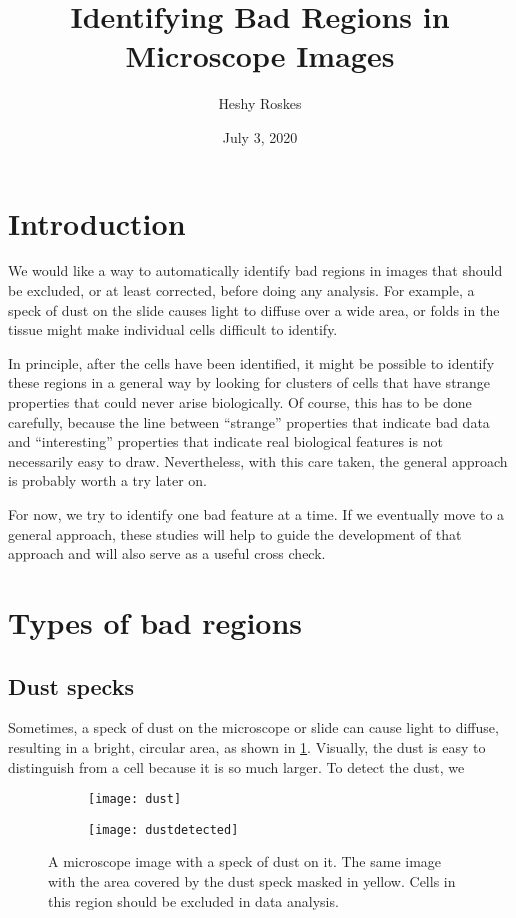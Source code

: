 \documentclass{article}
\begin{document}
	
\title{Identifying Bad Regions in Microscope Images}
\author{Heshy Roskes}
\date{July 3, 2020}

\section{Introduction}

We would like a way to automatically identify bad regions in images that should be excluded, or at least corrected, before doing any analysis.  For example, a speck of dust on the slide causes light to diffuse over a wide area, or folds in the tissue might make individual cells difficult to identify.

In principle, after the cells have been identified, it might be possible to identify these regions in a general way by looking for clusters of cells that have strange properties that could never arise biologically.  Of course, this has to be done carefully, because the line between ``strange'' properties that indicate bad data and ``interesting'' properties that indicate real biological features is not necessarily easy to draw.  Nevertheless, with this care taken, the general approach is probably worth a try later on.

For now, we try to identify one bad feature at a time.  If we eventually move to a general approach, these studies will help to guide the development of that approach and will also serve as a useful cross check.

\section{Types of bad regions}

\subsection{Dust specks}

Sometimes, a speck of dust on the microscope or slide can cause light to diffuse, resulting in a bright, circular area, as shown in \cref{fig:dustspeck}.  Visually, the dust is easy to distinguish from a cell because it is so much larger.  To detect the dust, we 

\begin{figure}[ht]
	\centering
	\begin{subfigure}{0.45\linewidth}
	\texttt{[image: dust]}
	\caption{}
	\label{fig:dustspeck}
	\end{subfigure}
	\begin{subfigure}{0.45\linewidth}
	\texttt{[image: dustdetected]}
	\caption{}
	\label{fig:dustspeckdetected}
	\end{subfigure}
	\caption{ A microscope image with a speck of dust on it.  The same image with the area covered by the dust speck masked in yellow.  Cells in this region should be excluded in data analysis.}
	\label{fig:dust}
\end{figure}
\end{document}
